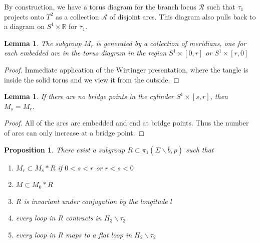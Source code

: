 \documentclass[11pt]{amsart}
\newtheorem{lemma}[theorem]{Lemma}
\newtheorem{proposition}[theorem]{Proposition}
\theoremstyle{definition}
\theoremstyle{remark}
\numberwithin{equation}{section}
\newcommand{\cR}{\mathcal{R}}
\newcommand{\cA}{\mathcal{A}}
\newcommand{\RR}{\mathbb{R}}
\begin{document}
By construction, we have a torus diagram for the branch locus $\cR$ such that $\tau_1$ projects onto $T^2$ as a collection $\cA$ of disjoint arcs.  This diagram also pulls back to a diagram on $S^1 \times \RR$ for $\overline{\tau}_1$.

\begin{lemma}
The subgroup $M_r$ is generated by a collection of meridians, one for each embedded arc in the torus diagram in the region $S^1 \times [0,r]$ or $S^1 \times [r,0]$
\end{lemma}

\begin{proof}
Immediate application of the Wirtinger presentation, where the tangle is inside the solid torus and we view it from the outside.
\end{proof}

\begin{lemma}
If there are no bridge points in the cylinder $S^1 \times [s,r]$, then $M_s = M_r$.
\end{lemma}

\begin{proof}
All of the arcs are embedded and end at bridge points.  Thus the number of arcs can only increase at a bridge point.
\end{proof}

\begin{proposition}
\label{prop:flat-decomposition}
There exist a subgroup $R \subset \pi_1(\Sigma \smallsetminus \overline{b},p)$ such that
\begin{enumerate}
\item $M_r \subset M_s \ast R$ if $0 < s < r$ or $r < s < 0$
\item $M \subset M_0 \ast R$
\item $R$ is invariant under conjugation by the longitude $l$
\item every loop in $R$ contracts in $H_3 \smallsetminus \tau_3$
\item every loop in $R$ maps to a flat loop in $H_2 \smallsetminus \tau_2$
\end{enumerate}
\end{proposition}
\end{document}
